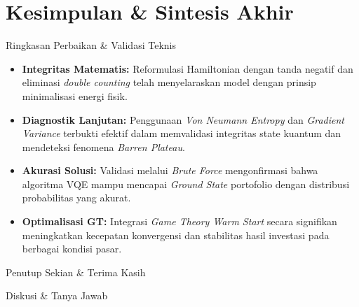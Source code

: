 \section{Kesimpulan \& Sintesis Akhir}

\begin{frame}{Ringkasan Perbaikan \& Validasi Teknis}
    \begin{itemize}
        \item \textbf{Integritas Matematis:} Reformulasi Hamiltonian dengan tanda negatif dan eliminasi \textit{double counting} telah menyelaraskan model dengan prinsip minimalisasi energi fisik.
        \item \textbf{Diagnostik Lanjutan:} Penggunaan \textit{Von Neumann Entropy} dan \textit{Gradient Variance} terbukti efektif dalam memvalidasi integritas state kuantum dan mendeteksi fenomena \textit{Barren Plateau}.
        \item \textbf{Akurasi Solusi:} Validasi melalui \textit{Brute Force} mengonfirmasi bahwa algoritma VQE mampu mencapai \textit{Ground State} portofolio dengan distribusi probabilitas yang akurat.
        \item \textbf{Optimalisasi GT:} Integrasi \textit{Game Theory Warm Start} secara signifikan meningkatkan kecepatan konvergensi dan stabilitas hasil investasi pada berbagai kondisi pasar.
    \end{itemize}
\end{frame}

\begin{frame}{Penutup}
    \centering
    \Huge{Sekian \& Terima Kasih}
    
    \vspace{1cm}
    \large{Diskusi \& Tanya Jawab}
\end{frame}
